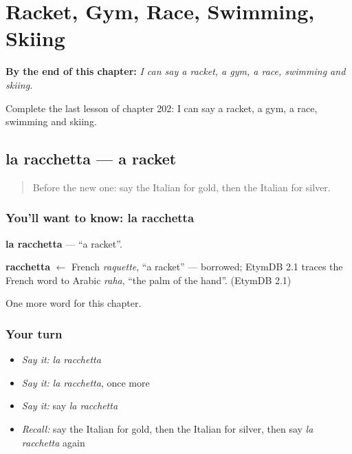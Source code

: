 
\chapter{Racket, Gym, Race, Swimming, Skiing}
\label{ch:it-racket-gym-race-swimming-skiing}

\begin{chapteropening}
\textbf{By the end of this chapter:} \emph{I can say a racket, a gym, a race, swimming and skiing.}

Complete the last lesson of chapter 202: I can say a racket, a gym, a race, swimming and skiing.
\end{chapteropening}

\section[la racchetta]{la racchetta — a racket}

\label{lesson:IT-C202-racchetta}



\begin{quote}
Before the new one: say the Italian for gold, then the Italian for silver.
\end{quote}

\subsection*{You'll want to know: la racchetta}
\textbf{la racchetta} — \textquotedblleft{}a racket\textquotedblright{}.

\begin{cousinweb}
\textbf{racchetta} $\leftarrow$ French \emph{raquette}, \textquotedblleft{}a racket\textquotedblright{} — borrowed; EtymDB 2.1 traces the French word to Arabic \emph{raha}, \textquotedblleft{}the palm of the hand\textquotedblright{}. (EtymDB 2.1)
\end{cousinweb}

\begin{grammarlens}[title={What you've built}]
One more word for this chapter.
\end{grammarlens}

\subsection*{Your turn}
\begin{itemize}
\raggedright
  \item \emph{Say it:} \emph{la racchetta}
  \item \emph{Say it:} \emph{la racchetta}, once more
  \item \emph{Say it:} say \emph{la racchetta}
  \item \emph{Recall:} say the Italian for gold, then the Italian for silver, then say \emph{la racchetta} again
\end{itemize}

